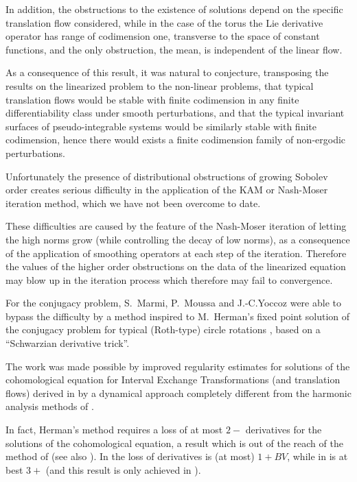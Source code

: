 \documentclass[11pt]{amsart}
\begin{document}
In addition, the obstructions to the existence of solutions depend on the specific translation flow considered, while in the case of the torus
the Lie derivative operator has range of codimension one, transverse to the space of constant functions, and the only obstruction, the mean, is independent
of the linear flow. 

\smallskip
As a consequence of this result, it was natural to conjecture, transposing the  results on the linearized problem to the non-linear problems, that typical translation flows would
be stable with finite codimension in any finite differentiability class under smooth perturbations, and that the typical invariant surfaces of pseudo-integrable 
systems would be similarly stable with finite codimension, hence there would exists a finite codimension family of non-ergodic perturbations. 

\smallskip
Unfortunately the presence of  distributional obstructions of growing Sobolev order creates serious difficulty in the application of the KAM or Nash-Moser  iteration
method, which we have not been overcome to date. 

\smallskip
These difficulties are caused by the feature of the Nash-Moser iteration of letting the high norms grow (while controlling
the decay of low norms), as a consequence of the application of smoothing operators at each step of the iteration. Therefore the values of the higher order obstructions on the data
of the linearized equation may blow up in the iteration process which therefore may fail to convergence. 

\smallskip
For the conjugacy problem, S.~Marmi, P.~Moussa and J.-C.Yoccoz \cite{MMY12} were able to bypass the difficulty
by a method inspired to M.~Herman's fixed point solution of the conjugacy problem for typical (Roth-type) circle rotations  \cite{He85}, based on a ``Schwarzian derivative trick''. 

\smallskip
The work \cite{MMY12}  was made possible by improved regularity estimates for solutions of the cohomological equation for Interval Exchange Transformations (and translation flows) derived in \cite{MMY05} by a dynamical approach completely different from the harmonic analysis methods of \cite{F97}. 

In fact, Herman's method requires a loss of at most $2-$ derivatives for the solutions of the cohomological equation, a result which is out of the reach of the method of \cite{F97}  (see also \cite{F21}).  In \cite{MMY05} the loss of derivatives is (at most) $1+ BV$, while in \cite{F97} is at best $3 +$ (and this result is only achieved in \cite{F21}).
\end{document}
